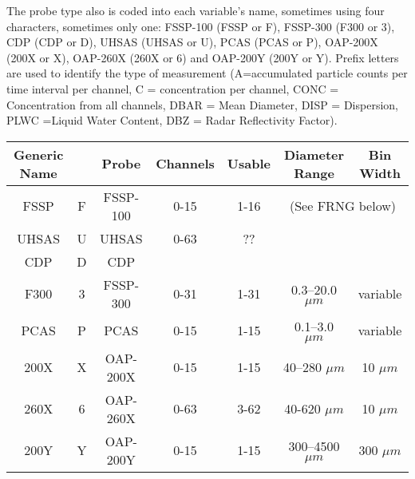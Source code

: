 The probe type also is coded into each variable's name, sometimes
using four characters, sometimes only one: FSSP-100 (FSSP or F), FSSP-300
(F300 or 3), CDP (CDP or D), UHSAS (UHSAS or U), PCAS (PCAS or P),
OAP-200X (200X or X), OAP-260X (260X or 6) and OAP-200Y (200Y or Y).
Prefix letters are used to identify the type of measurement (A=accumulated
particle counts per time interval per channel, C = concentration per
channel, CONC = Concentration from all channels, DBAR = Mean Diameter,
DISP = Dispersion, PLWC =Liquid Water Content, DBZ = Radar Reflectivity
Factor).

\noindent \begin{center}
\begin{tabular}{|c|c|c|c|c|c|c|}
\hline 
\textbf{\small Generic Name} &  & \textbf{\small Probe} & \textbf{\small Channels} & \textbf{\small Usable} & \textbf{\small Diameter Range} & \textbf{\small Bin Width}\tabularnewline
\hline 
\hline 
{\small FSSP} & {\small F} & {\small FSSP-100} & {\small 0-15} & {\small 1-16} & \multicolumn{2}{c|}{{\small (See FRNG below)}}\tabularnewline
\hline 
UHSAS & U & UHSAS & 0-63 & ?? & \multicolumn{1}{c||}{} & \tabularnewline
\hline 
CDP & D & CDP &  &  & \multicolumn{1}{c||}{} & \tabularnewline
\hline 
{\small F300} & {\small 3} & {\small FSSP-300} & {\small 0-31} & {\small 1-31} & {\small 0.3--20.0 $\mu m$} & {\small variable}\tabularnewline
\hline 
{\small PCAS} & {\small P} & {\small PCAS} & {\small 0-15} & {\small 1-15} & {\small 0.1--3.0 $\mu m$} & {\small variable}\tabularnewline
\hline 
{\small 200X} & {\small X} & {\small OAP-200X} & {\small 0-15} & {\small 1-15} & {\small 40--280 $\mu m$} & {\small 10 $\mu m$}\tabularnewline
\hline 
{\small 260X} & {\small 6} & {\small OAP-260X} & {\small 0-63} & {\small 3-62} & {\small 40-620 $\mu m$} & {\small 10 $\mu m$}\tabularnewline
\hline 
{\small 200Y} & {\small Y} & {\small OAP-200Y} & {\small 0-15} & {\small 1-15} & {\small 300--4500 $\mu m$} & {\small 300 $\mu m$}\tabularnewline
\hline 
\end{tabular}\\

\par\end{center}
